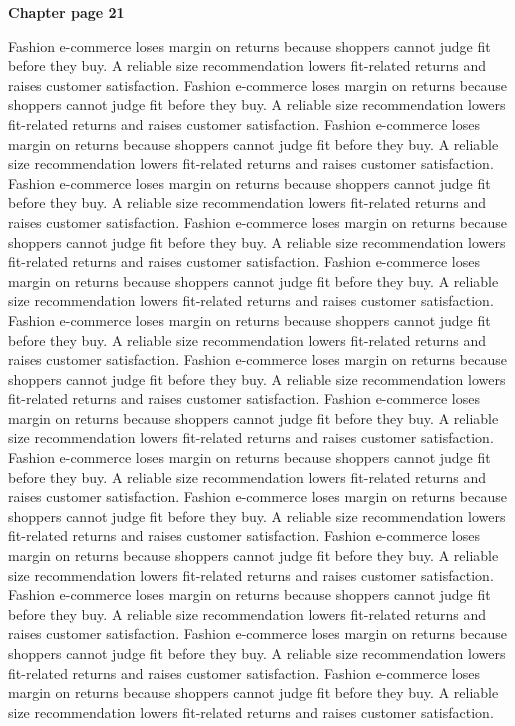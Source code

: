 \documentclass[a4paper,11pt]{article}
\begin{document}
{\headfont\bfseries\Large Chapter page 21}\par\medskip
Fashion e-commerce loses margin on returns because shoppers cannot judge fit before they buy. A reliable size recommendation lowers fit-related returns and raises customer satisfaction. Fashion e-commerce loses margin on returns because shoppers cannot judge fit before they buy. A reliable size recommendation lowers fit-related returns and raises customer satisfaction. Fashion e-commerce loses margin on returns because shoppers cannot judge fit before they buy. A reliable size recommendation lowers fit-related returns and raises customer satisfaction. Fashion e-commerce loses margin on returns because shoppers cannot judge fit before they buy. A reliable size recommendation lowers fit-related returns and raises customer satisfaction. Fashion e-commerce loses margin on returns because shoppers cannot judge fit before they buy. A reliable size recommendation lowers fit-related returns and raises customer satisfaction. 
Fashion e-commerce loses margin on returns because shoppers cannot judge fit before they buy. A reliable size recommendation lowers fit-related returns and raises customer satisfaction. Fashion e-commerce loses margin on returns because shoppers cannot judge fit before they buy. A reliable size recommendation lowers fit-related returns and raises customer satisfaction. Fashion e-commerce loses margin on returns because shoppers cannot judge fit before they buy. A reliable size recommendation lowers fit-related returns and raises customer satisfaction. Fashion e-commerce loses margin on returns because shoppers cannot judge fit before they buy. A reliable size recommendation lowers fit-related returns and raises customer satisfaction. Fashion e-commerce loses margin on returns because shoppers cannot judge fit before they buy. A reliable size recommendation lowers fit-related returns and raises customer satisfaction. 
Fashion e-commerce loses margin on returns because shoppers cannot judge fit before they buy. A reliable size recommendation lowers fit-related returns and raises customer satisfaction. Fashion e-commerce loses margin on returns because shoppers cannot judge fit before they buy. A reliable size recommendation lowers fit-related returns and raises customer satisfaction. Fashion e-commerce loses margin on returns because shoppers cannot judge fit before they buy. A reliable size recommendation lowers fit-related returns and raises customer satisfaction. Fashion e-commerce loses margin on returns because shoppers cannot judge fit before they buy. A reliable size recommendation lowers fit-related returns and raises customer satisfaction. Fashion e-commerce loses margin on returns because shoppers cannot judge fit before they buy. A reliable size recommendation lowers fit-related returns and raises customer satisfaction. \newpage
\end{document}
